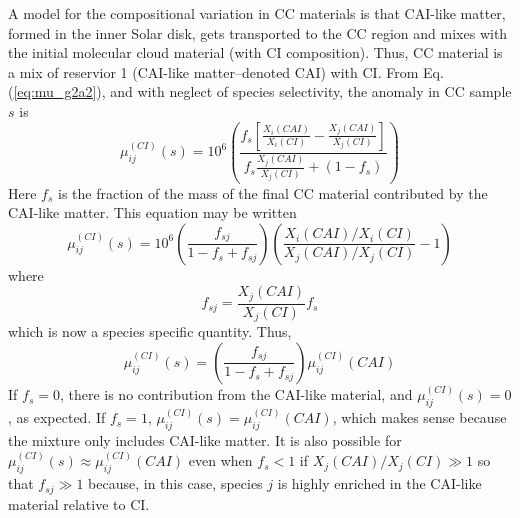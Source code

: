 \documentclass[preprint]{revtex4-2}
\begin{document}
A model for the compositional variation in CC materials is that CAI-like
matter, formed in the inner Solar disk, gets transported to the CC region
and mixes with the initial molecular cloud material (with CI composition).
Thus, CC material is a mix of reservior 1 (CAI-like matter--denoted CAI)
with CI.
From Eq. (\ref{eq:mu_g2a2}), and with neglect of species selectivity,
the anomaly in CC sample $s$ is
\begin{equation}
\mu_{ij}^{(CI)}(s) =
10^6 \left(\frac{f_s \left[\frac{X_i(CAI)}{X_i(CI)} -
\frac{X_j(CAI)}{X_j(CI)}\right]}
{f_s \frac{X_j(CAI)}{X_j(CI)} + \left(1 - f_s\right)}\right)
\label{eq:mu_g_cai}
\end{equation}
Here $f_s$ is the fraction of the mass of the final CC material contributed
by the CAI-like matter.
This equation may be written
\begin{equation}
\mu_{ij}^{(CI)}(s) =
10^6 \left(\frac{f_{sj}}{1 - f_s + f_{sj}}\right)
\left(\frac{X_i(CAI)/X_i(CI)}{X_j(CAI)/X_j(CI)} - 1\right)
\label{eq:mu_g_cai2}
\end{equation}
where
\begin{equation}
f_{sj} = \frac{X_j(CAI)}{X_j(CI)} f_s
\label{eq:fsj}
\end{equation}
which is now a species specific quantity.
Thus,
\begin{equation}
\mu_{ij}^{(CI)}(s) =
\left(\frac{f_{sj}}{1 - f_s + f_{sj}}\right) \mu_{ij}^{(CI)}(CAI)
\label{eq:mu_g_cai3}
\end{equation}
If $f_s = 0$, there is no contribution
from the CAI-like material, and $\mu_{ij}^{(CI)}(s) = 0$, as expected.
If $f_s = 1$, $\mu_{ij}^{(CI)}(s) = \mu_{ij}^{(CI)}(CAI)$, which makes
sense because the mixture only includes CAI-like matter.
It is also possible for $\mu_{ij}^{(CI)}(s) \approx \mu_{ij}^{(CI)}(CAI)$ even
when $f_s < 1$ if $X_j(CAI) / X_j(CI) \gg 1$ so
that $f_{sj} \gg 1$ because, in this
case, species $j$ is highly enriched in the CAI-like material relative to
CI.
\end{document}
